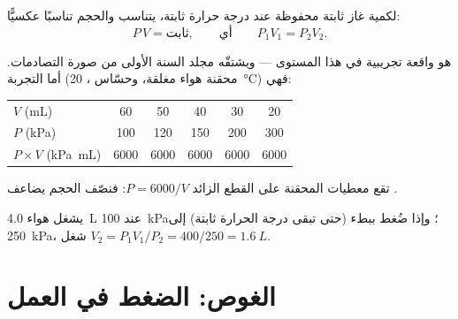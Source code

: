 \begin{proposition}\label{prop:g10:pressure:boyle}
لكمية غاز ثابتة محفوظة عند درجة حرارة ثابتة، يتناسب 
والحجم تناسبًا عكسيًّا:
\[
P \, V = \text{ثابت},
\qquad\text{أي}\qquad
P_1 V_1 = P_2 V_2 .
\]
\end{proposition}
\admitted

\begin{remark}
هو واقعة تجريبية في هذا المستوى --- ويشتقّه مجلد السنة الأولى
من صورة التصادمات. أما التجربة (محقنة هواء مغلقة،
وحسّاس ، \qty{20}{\degreeCelsius}) فهي:
\begin{center}
\begin{tabular}{lccccc}
$V$ (\unit{mL}) & 60 & 50 & 40 & 30 & 20 \\
$P$ (\unit{kPa}) & 100 & 120 & 150 & 200 & 300 \\
$P \times V$ (\unit{kPa.mL}) & 6000 & 6000 & 6000 & 6000 & 6000
\end{tabular}
\end{center}
\end{remark}

\begin{omfigure}

{\small تقع معطيات المحقنة على القطع الزائد $P = 6000/V$: فنصّف الحجم يضاعف .}
\end{omfigure}

\begin{example}\label{ex:g10:pressure:boyle}
يشغل هواء \qty{4.0}{L} عند \qty{100}{kPa}؛ وإذا ضُغط ببطء (حتى تبقى
درجة الحرارة ثابتة) إلى \qty{250}{kPa}، شغل
$V_2 = P_1 V_1 / P_2 = 400/250 = \qty{1.6}{L}$.
\end{example}

\section{الغوص: الضغط في العمل}

